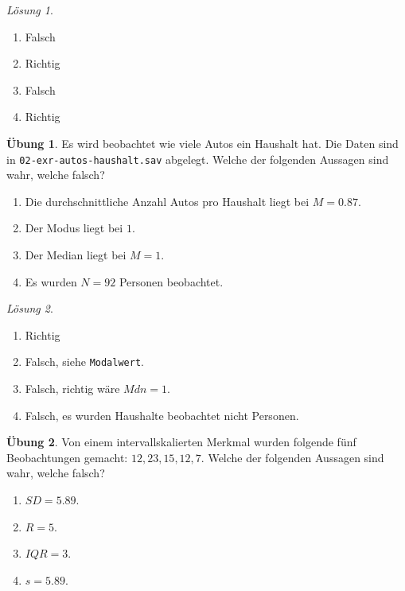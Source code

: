 \documentclass[
]{book}
\providecommand{\tightlist}{%
  \setlength{\itemsep}{0pt}\setlength{\parskip}{0pt}}
\theoremstyle{definition}
\theoremstyle{definition}
\theoremstyle{definition}
\newtheorem{exercise}{Übung}[chapter]
\theoremstyle{definition}
\theoremstyle{remark}
\newtheorem*{solution}{Lösung}
\begin{document}
\begin{solution}
\leavevmode

\begin{enumerate}
\def\labelenumi{\alph{enumi})}
\tightlist
\item
  Falsch
\item
  Richtig
\item
  Falsch
\item
  Richtig
\end{enumerate}

\end{solution}

\begin{exercise}
\leavevmode

Es wird beobachtet wie viele Autos ein Haushalt hat. Die Daten sind in \texttt{02-exr-autos-haushalt.sav} abgelegt. Welche der folgenden Aussagen sind wahr, welche falsch?

\begin{enumerate}
\def\labelenumi{\alph{enumi})}
\tightlist
\item
  Die durchschnittliche Anzahl Autos pro Haushalt liegt bei \(M=0.87\).
\item
  Der Modus liegt bei \(1\).
\item
  Der Median liegt bei \(M=1\).
\item
  Es wurden \(N=92\) Personen beobachtet.
\end{enumerate}

\end{exercise}

\begin{solution}
\leavevmode

\begin{enumerate}
\def\labelenumi{\alph{enumi})}
\tightlist
\item
  Richtig
\item
  Falsch, siehe \texttt{Modalwert}.
\item
  Falsch, richtig wäre \(Mdn=1\).
\item
  Falsch, es wurden Haushalte beobachtet nicht Personen.
\end{enumerate}

\end{solution}

\begin{exercise}
\leavevmode

Von einem intervallskalierten Merkmal wurden folgende fünf Beobachtungen gemacht: \(12, 23, 15, 12, 7\). Welche der folgenden Aussagen sind wahr, welche falsch?

\begin{enumerate}
\def\labelenumi{\alph{enumi})}
\tightlist
\item
  \(SD = 5.89\).
\item
  \(R = 5\).
\item
  \(IQR = 3\).
\item
  \(s = 5.89\).
\end{enumerate}

\end{exercise}
\end{document}
